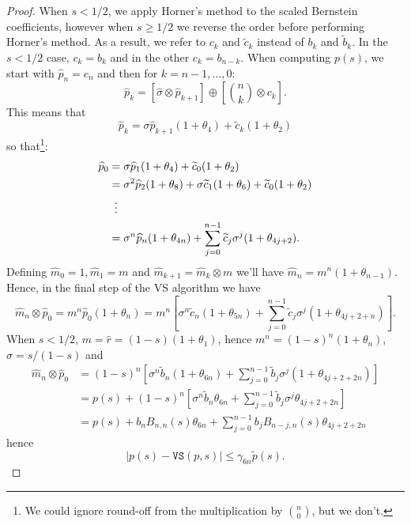\documentclass[letterpaper,10pt]{article}
\theoremstyle{definition}
\begin{document}
\begin{proof}
When \(s < 1/2\), we apply Horner's method to the scaled Bernstein
coefficients, however when \(s \geq 1/2\) we reverse the order
before performing Horner's method. As a result, we refer to
\(c_k\) and \(\widetilde{c}_k\) instead of \(b_k\) and
\(\widetilde{b}_k\). In the \(s < 1/2\) case, \(c_k = b_k\) and
in the other \(c_k = b_{n - k}\).
When computing \(p(s)\), we start with \(\widehat{p}_n = c_n\)
and then for \(k = n - 1, \ldots, 0\):
\begin{equation}
\widehat{p}_k = \left[\widehat{\sigma} \otimes \widehat{p}_{k + 1}\right]
  \oplus \left[\binom{n}{k} \otimes c_k\right].
\end{equation}
This means that
\begin{equation}
\widehat{p}_k = \sigma \widehat{p}_{k + 1} (1 + \theta_4)
+ \widetilde{c}_k (1 + \theta_2)
\end{equation}
so that\footnote{We could ignore round-off from the multiplication by
\(\binom{n}{0}\), but we don't.}:
\begin{align}
\widehat{p}_0 &= \sigma \widehat{p}_1 (1 + \theta_4)
+ \widetilde{c}_0 (1 + \theta_2) \\
&= \sigma^2 \widehat{p}_2 (1 + \theta_8) +
  \sigma \widetilde{c}_1 (1 + \theta_6) +
  \widetilde{c}_0 (1 + \theta_2) \\
&\mathrel{\makebox[\widthof{=}]{\vdots}} \nonumber \\
&= \sigma^n \widehat{p}_n (1 + \theta_{4n}) +
  \sum_{j = 0}^{n - 1} \widetilde{c}_j \sigma^j (1 + \theta_{4j + 2}).
\end{align}
Defining \(\widehat{m}_0 = 1, \widehat{m}_1 = m\)
and \(\widehat{m}_{k + 1} = \widehat{m}_k \otimes m\) we'll have
\(\widehat{m}_n = m^n (1 + \theta_{n - 1})\).
Hence, in the final step of the VS algorithm we have
\begin{equation}
\widehat{m}_n \otimes \widehat{p}_0 =
m^n \widehat{p}_0 (1 + \theta_n) = m^n \left[
  \sigma^n \widetilde{c}_n (1 + \theta_{5n}) +
  \sum_{j = 0}^{n - 1} \widetilde{c}_j \sigma^j
  (1 + \theta_{4j + 2 + n})\right].
\end{equation}
When \(s < 1/2\), \(m = \widehat{r} = (1 - s)(1 + \theta_1)\), hence
\(m^n = (1 - s)^n (1 + \theta_n)\), \(\sigma = s/(1 - s)\) and
\begin{align}
\widehat{m}_n \otimes \widehat{p}_0 &= (1 - s)^n \left[
  \sigma^n \widetilde{b}_n (1 + \theta_{6n}) +
  \sum_{j = 0}^{n - 1} \widetilde{b}_j \sigma^j
  (1 + \theta_{4j + 2 + 2n})\right] \\
&= p(s) + (1 - s)^n \left[
  \sigma^n \widetilde{b}_n \theta_{6n} +
  \sum_{j = 0}^{n - 1} \widetilde{b}_j \sigma^j
  \theta_{4j + 2 + 2n}\right] \\
&= p(s) +
  b_n B_{n, n}(s) \theta_{6n} +
  \sum_{j = 0}^{n - 1} b_j B_{n - j, n}(s)
  \theta_{4j + 2 + 2n}
\end{align}
hence
\begin{equation}
\left|p(s) - \mathtt{VS}(p, s)\right| \leq \gamma_{6n}
  \widetilde{p}(s).
\end{equation}


\end{proof}
\end{document}
